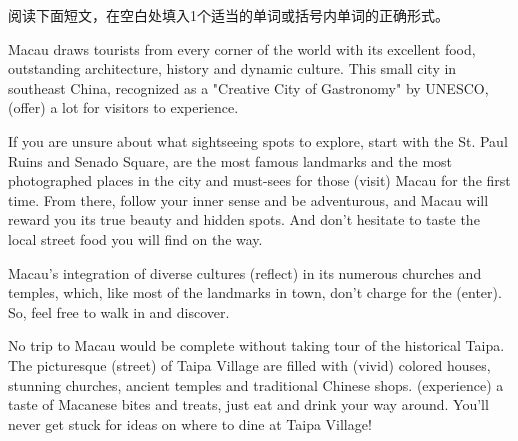 \documentclass{英语试卷}
\begin{document}
\par 阅读下面短文，在空白处填入1个适当的单词或括号内单词的正确形式。\par
\par Macau draws tourists from every corner of the world with its excellent food, outstanding architecture, history and dynamic culture. This small city in southeast China, recognized as a "Creative City of Gastronomy" by UNESCO, \blanknum{} (offer) a lot for visitors to experience.\par
\par If you are unsure about what sightseeing spots to explore, start with the St. Paul Ruins and Senado Square,  are the most famous landmarks and the most photographed places in the city and must-sees for those  (visit) Macau for the first time. From there, follow your inner sense and be adventurous, and Macau will reward you  its true beauty and hidden spots. And don't hesitate to taste the local street food you will find on the way.\par
\par Macau's integration of diverse cultures  (reflect) in its numerous churches and temples, which, like most of the landmarks in town, don't charge for the  (enter). So, feel free to walk in and discover.\par
\par No trip to Macau would be complete without taking  tour of the historical Taipa. The picturesque  (street) of Taipa Village are filled with  (vivid) colored houses, stunning churches, ancient temples and traditional Chinese shops.  (experience) a taste of Macanese bites and treats, just eat and drink your way around. You'll never get stuck for ideas on where to dine at Taipa Village!\par
\end{document}
